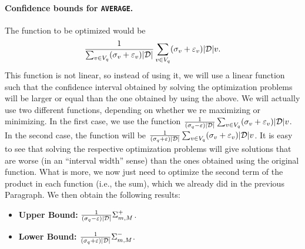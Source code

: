 %
%
%

\paragraph{Confidence bounds for \texttt{AVERAGE}.}

The function to be optimized would be \[
\frac{1}{\sum_{v\in V_q}(\sigma_v+\varepsilon_v)|{\cal D}|}\sum_{v\in
V_q}(\sigma_v+\varepsilon_v)|{\cal D}|v.\]
This function is not linear, so instead of using it, we will use a linear
function such that the confidence interval obtained by solving the optimization
problems will be larger or equal than the one obtained by using the above.
We will actually use two different functions, depending on whether we re
maximizing or minimizing. In the first case, we use the function
$\frac{1}{(\sigma_q-\varepsilon)|{\cal D}|}\sum_{v\in V_q}(\sigma_v+\varepsilon_v)|{\cal D}|v$.
In the second case, the function will be
$\frac{1}{(\sigma_q+\varepsilon)|{\cal D}|}\sum_{v\in V_q}(\sigma_v+\varepsilon_v)|{\cal D}|v$.
It is easy to see that solving the respective optimization problems will give
solutions that are worse (in an ``interval width'' sense) than the ones
obtained using the original function. What is more, we now just need to optimize
the second term of the product in each function (i.e., the sum), which we
already did in the previous Paragraph. We then obtain the following results: 

\begin{itemize}
  \item {\bf Upper Bound:} $\frac{1}{(\sigma_q-\varepsilon)|{\cal D}|}\Sigma^+_{m,M}$.
  \item {\bf Lower Bound:} $\frac{1}{(\sigma_q+\varepsilon)|{\cal D}|}\Sigma^-_{m,M}$.
\end{itemize}

